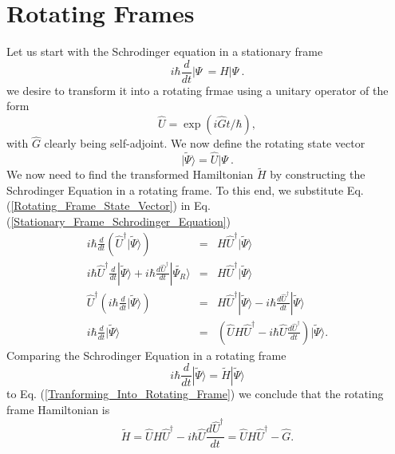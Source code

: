 %
\chapter{Rotating Frames}\label{Rotating Frame}
%
Let us start with the Schrodinger equation in a stationary frame
\begin{equation}\label{Stationary_Frame_Schrodinger_Equation}
i \hbar \frac{d}{dt} \left| \Psi \> = H \left| \Psi \>.
\end{equation}
we desire to transform it into a rotating frmae using a unitary operator of the form
\begin{equation}
\hat{U} = \exp\left( i \hat{G} t / \hbar \right),
\end{equation}
with $\hat{G}$ clearly being self-adjoint. We now define the rotating state vector
\begin{equation}\label{Rotating_Frame_State_Vector}
| \tilde{\Psi} \rangle = \hat{U} \left| \Psi \>.
\end{equation}
We now need to find the  transformed Hamiltonian $\tilde{H}$ by constructing the Schrodinger Equation in a rotating frame. To this end, we substitute Eq. (\ref{Rotating_Frame_State_Vector}) in Eq. (\ref{Stationary_Frame_Schrodinger_Equation})
\begin{eqnarray}\label{Tranforming_Into_Rotating_Frame}
i\hbar \frac{d}{dt} \left( \hat{U}^\dagger | \tilde{\Psi} \rangle \right) & =& H \hat{U}^\dagger | \tilde{\Psi} \rangle \nonumber \\
i\hbar \hat{U}^\dagger \frac{d}{dt} | \tilde{\Psi} \rangle  + i \hbar \frac{d\hat{U}^\dagger}{dt} | \tilde{\Psi_R} \rangle & = & H \hat{U}^\dagger | \tilde{\Psi} \rangle \nonumber \\
\hat{U}^\dagger \left(i \hbar \frac{d}{dt} | \tilde{\Psi} \rangle \right) & = &  H \hat{U}^\dagger | \tilde{\Psi} \rangle - i \hbar \frac{d \hat{U}^\dagger}{dt} | \tilde{\Psi} \rangle \nonumber \\
i \hbar \frac{d}{dt} | \tilde{\Psi} \rangle & = & \left( \hat{U} H \hat{U}^\dagger - i \hbar \hat{U}\frac{d \hat{U}^\dagger}{dt}  \right) | \tilde{\Psi} \rangle.
\end{eqnarray}
Comparing the Schrodinger Equation in a rotating frame 
\begin{equation}
i \hbar \frac{d}{dt} | \tilde{\Psi} \rangle = \tilde{H} | \tilde{\Psi} \rangle
\end{equation}
to Eq. (\ref{Tranforming_Into_Rotating_Frame}) we conclude that the rotating frame Hamiltonian is 
\begin{equation}
\tilde{H} =\hat{U} H \hat{U}^\dagger - i \hbar \hat{U}\frac{d \hat{U}^\dagger}{dt} =  \hat{U} H \hat{U}^\dagger - \hat{G}. 
\end{equation}




